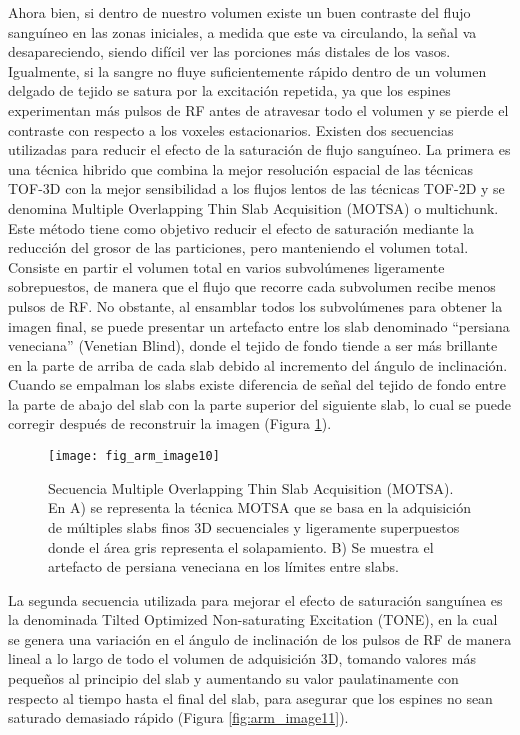 Ahora bien, si dentro de nuestro volumen existe un buen contraste del flujo sanguíneo en las zonas iniciales, a medida que este va circulando, la señal va desapareciendo, siendo difícil ver las porciones más distales de los vasos. Igualmente, si la sangre no fluye suficientemente rápido dentro de un volumen delgado de tejido se satura por la excitación repetida, ya que los espines experimentan más pulsos de RF antes de atravesar todo el volumen y se pierde el contraste con respecto a los voxeles estacionarios. 
Existen dos secuencias utilizadas para reducir el efecto de la saturación de flujo sanguíneo. La primera es una técnica hibrido que combina la mejor resolución espacial de las técnicas TOF-3D con la mejor sensibilidad a los flujos lentos de las técnicas TOF-2D y se denomina Multiple Overlapping Thin Slab Acquisition (MOTSA) o multichunk. Este método tiene como objetivo reducir el efecto de saturación mediante la reducción del grosor de las particiones, pero manteniendo el volumen total. Consiste en partir el volumen total en varios subvolúmenes ligeramente sobrepuestos, de manera que el flujo que recorre cada subvolumen recibe menos pulsos de RF. No obstante, al ensamblar todos los subvolúmenes para obtener la imagen final, se puede presentar un artefacto entre los slab denominado ``persiana veneciana'' (Venetian Blind), donde el tejido de fondo tiende a ser más brillante en la parte de arriba de cada slab debido al incremento del ángulo de inclinación. Cuando se empalman los slabs existe diferencia de señal del tejido de fondo entre la parte de abajo del slab con la parte superior del siguiente slab, lo cual se puede corregir después de reconstruir la imagen (Figura \ref{fig:arm_image10}). 


\begin{figure}[htbp]
\begin{figg}
 \texttt{[image: fig\_arm\_image10]}
 \caption{
Secuencia Multiple Overlapping Thin Slab Acquisition (MOTSA). En A) se representa la técnica MOTSA que se basa en la adquisición de múltiples slabs finos 3D secuenciales y ligeramente superpuestos donde el área gris representa el solapamiento. B) Se muestra el artefacto de persiana veneciana en los límites entre slabs.
 }
 \label{fig:arm_image10}
\end{figg}
\end{figure}



La segunda secuencia utilizada para mejorar el efecto de saturación sanguínea es la denominada Tilted Optimized Non-saturating Excitation (TONE), en la cual se genera una variación en el ángulo de inclinación de los pulsos de RF de manera lineal a lo largo de todo el volumen de adquisición 3D, tomando valores más pequeños al principio del slab y aumentando su valor paulatinamente con respecto al tiempo hasta el final del slab, para asegurar que los espines no sean saturado demasiado rápido (Figura \ref{fig:arm_image11}).


